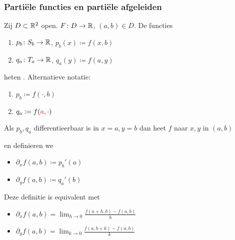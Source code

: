 \documentclass{2wa40summary}
\begin{document}
	\subsubsection{Parti\"ele functies en parti\"ele afgeleiden}
	
	\begin{define}
		Zij $D \subset \mathbb{R}^2$ open. $F\colon D \to \mathbb{R}$, $(a,b) \in D$.
		De functies
		\begin{enumerate}
			\item $p_b\colon S_b \to \mathbb{R}$, $p_b(x)\coloneqq f(x,b)$
			\item $q_a\colon T_a \to \mathbb{R}$, $q_a(y)\coloneqq f(a,y)$
		\end{enumerate}
		heten .
		Alternatieve notatie:
		\begin{enumerate}
			\item $p_b\coloneqq f(\cdot, b)$
			\item $q_a\coloneqq f({\color{red}a},\cdot)$
		\end{enumerate}
		
	\end{define}
	
	\begin{define}
		Als $p_b, q_a$ differentieerbaar is in $x=a,y=b$ dan heet $f$  naar $x,y$ in $(a,b)$
		
		en definieren we
		\begin{itemize}
			\item $\partial_x f(a,b) \coloneqq  p_b'(a)$
			\item $\partial_y f(a,b) \coloneqq  q_a'(b)$
		\end{itemize}
		
	\end{define}
	
	\begin{gevolg}
		
		Deze definitie is equivalent met
		\begin{itemize}
			\item $\displaystyle\partial_x f(a,b)=\lim_{h \to 0} \frac{f(a+h,b)-f(a,b)}{h}$
			\item $\displaystyle\partial_y f(a,b)=\lim_{k \to 0} \frac{f(a,b+k)-f(a,b)}{k}$
		\end{itemize}
		
	\end{gevolg}
	
\end{document}
